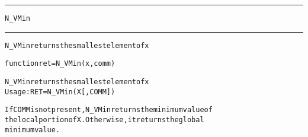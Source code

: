 \begin{samepage}
\hrule
\begin{center}
{\large \verb!N_VMin!}
\label{p:N_VMin}
\end{center}
\hrule\vspace{0.1in}



\begin{alltt}
N_VMin returns the smallest element of x
\end{alltt}

\end{samepage}



\begin{samepage}


\begin{alltt}
function ret = N_VMin(x,comm) 
\end{alltt}

\end{samepage}



\begin{alltt}
N_VMin returns the smallest element of x
   Usage:  RET = N_VMin ( X [, COMM] )

If COMM is not present, N_VMin returns the minimum value of 
the local portion of X. Otherwise, it returns the global
minimum value.
\end{alltt}





 



\vspace{0.1in}